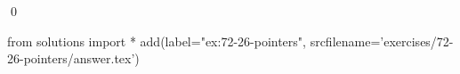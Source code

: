 
\begin{ex}
  \label{ex:72-26-pointers}
  
  \qed
\end{ex}
\begin{python0}
from solutions import *
add(label="ex:72-26-pointers",
    srcfilename='exercises/72-26-pointers/answer.tex')
\end{python0}
